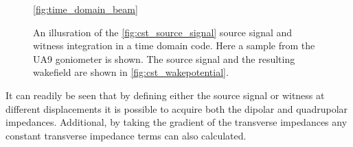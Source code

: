 \begin{figure}

\caption{An illusration of the \ref{fig:cst_source_signal} source signal and witness integration in a time domain code. Here a sample from the UA9 goniometer is shown. The source signal and the resulting wakefield are shown in \ref{fig:cst_wakepotential}.}
\ref{fig:time_domain_beam}
\end{figure}

It can readily be seen that by defining either the source signal or witness at different displacements it is possible to acquire both the dipolar and quadrupolar impedances. Additional, by taking the gradient of the transverse impedances any constant transverse impedance terms can also calculated.
